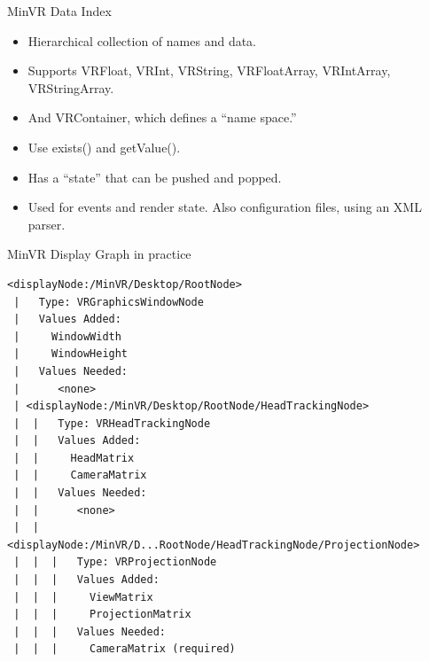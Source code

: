 \documentclass[12pt]{article}
\begin{document}
\begin{frame}{MinVR Data Index}

\begin{center}
\begin{minipage}{0.8\columnwidth}

\begin{itemize}\raggedright
\item Hierarchical collection of names and data.

\item Supports VRFloat, VRInt, VRString, VRFloatArray, VRIntArray,
  VRStringArray.

\item And VRContainer, which defines a ``name space.''

\item Use exists() and getValue().

\item Has a ``state'' that can be pushed and popped.

\item Used for events and render state.  Also configuration files,
  using an XML parser.

\end{itemize}

\end{minipage}
\end{center}
\end{frame}



\begin{frame}[fragile]{MinVR Display Graph in practice}

\begin{Verbatim}[fontsize=\scriptsize]
 <displayNode:/MinVR/Desktop/RootNode>
 |   Type: VRGraphicsWindowNode
 |   Values Added:
 |     WindowWidth
 |     WindowHeight
 |   Values Needed:
 |      <none>
 | <displayNode:/MinVR/Desktop/RootNode/HeadTrackingNode>
 |  |   Type: VRHeadTrackingNode
 |  |   Values Added:
 |  |     HeadMatrix
 |  |     CameraMatrix
 |  |   Values Needed:
 |  |      <none>
 |  | <displayNode:/MinVR/D...RootNode/HeadTrackingNode/ProjectionNode>
 |  |  |   Type: VRProjectionNode
 |  |  |   Values Added:
 |  |  |     ViewMatrix
 |  |  |     ProjectionMatrix
 |  |  |   Values Needed:
 |  |  |     CameraMatrix (required)
\end{Verbatim}
\end{frame}
\end{document}
